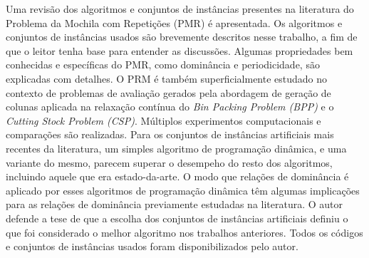 Uma revisão dos algoritmos e conjuntos de instâncias presentes na literatura do Problema da Mochila com Repetições (PMR) é apresentada.
Os algoritmos e conjuntos de instâncias usados são brevemente descritos nesse trabalho, a fim de que o leitor tenha base para entender as discussões.
Algumas propriedades bem conhecidas e específicas do PMR, como dominância e periodicidade, são explicadas com detalhes.
O PRM é também superficialmente estudado no contexto de problemas de avaliação gerados pela abordagem de geração de colunas aplicada na relaxação contínua do \emph{Bin Packing Problem (BPP)} e o \emph{Cutting Stock Problem (CSP)}.
Múltiplos experimentos computacionais e comparações são realizadas.
Para os conjuntos de instâncias artificiais mais recentes da literatura, um simples algoritmo de programação dinâmica, e uma variante do mesmo, parecem superar o desempeho do resto dos algoritmos, incluindo aquele que era estado-da-arte.
O modo que relações de dominância é aplicado por esses algoritmos de programação dinâmica têm algumas implicações para as relações de dominância previamente estudadas na literatura.
O autor defende a tese de que a escolha dos conjuntos de instâncias artificiais definiu o que foi considerado o melhor algoritmo nos trabalhos anteriores.
Todos os códigos e conjuntos de instâncias usados foram disponibilizados pelo autor.
 

